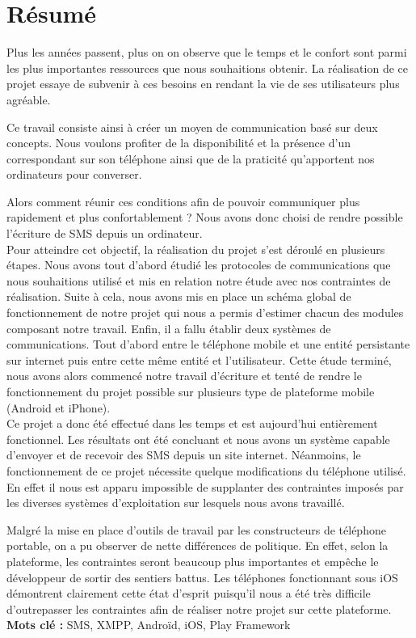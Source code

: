 \cleardoublepage



\chapter*{Résumé}

\thispagestyle{empty}



Plus les années passent, plus on on observe que le temps et le confort sont parmi
les plus importantes ressources que nous souhaitions obtenir. La réalisation de ce
projet essaye de subvenir à ces besoins en rendant la vie de ses utilisateurs plus agréable.

Ce travail consiste ainsi à créer un moyen de communication basé sur deux concepts.
Nous voulons profiter de la disponibilité et la présence d'un correspondant sur son 
téléphone ainsi que de la praticité qu'apportent nos ordinateurs pour converser.

Alors comment réunir ces conditions afin de pouvoir communiquer plus rapidement et plus confortablement ?
Nous avons donc choisi de rendre possible l'écriture de SMS depuis un ordinateur.
\\


Pour atteindre cet objectif, la réalisation du projet s'est déroulé en plusieurs étapes.
Nous avons tout d'abord étudié les protocoles de communications que nous souhaitions utilisé
et mis en relation notre étude avec nos contraintes de réalisation. Suite à cela, nous avons
mis en place un schéma global de fonctionnement de notre projet qui nous a permis d'estimer
chacun des modules composant notre travail. Enfin, il a fallu établir deux systèmes de communications.
Tout d'abord entre le téléphone mobile et une entité persistante sur internet puis entre
cette même entité et l'utilisateur. Cette étude terminé, nous avons alors commencé notre
travail d'écriture et tenté de rendre le fonctionnement du projet possible sur plusieurs
type de plateforme mobile (Android et iPhone).
\\


Ce projet a donc été effectué dans les temps et est aujourd'hui entièrement fonctionnel.
Les résultats ont été concluant et nous avons un système capable d'envoyer et de recevoir
des SMS depuis un site internet. Néanmoins, le fonctionnement de ce projet nécessite quelque 
modifications du téléphone utilisé. En effet il nous est apparu impossible de supplanter
des contraintes imposés par les diverses systèmes d'exploitation sur lesquels nous avons travaillé.

Malgré la mise en place d'outils de travail par les constructeurs de téléphone portable,
on a pu observer de nette différences de politique. En effet, selon la plateforme, les contraintes
seront beaucoup plus importantes et empêche le développeur de sortir des sentiers battus. 
Les téléphones fonctionnant sous iOS démontrent clairement cette état d'esprit puisqu'il 
nous a été très difficile d'outrepasser les contraintes afin de réaliser notre projet sur cette plateforme.
\\



\textbf{Mots clé : } SMS, XMPP, Androïd, iOS, Play Framework
